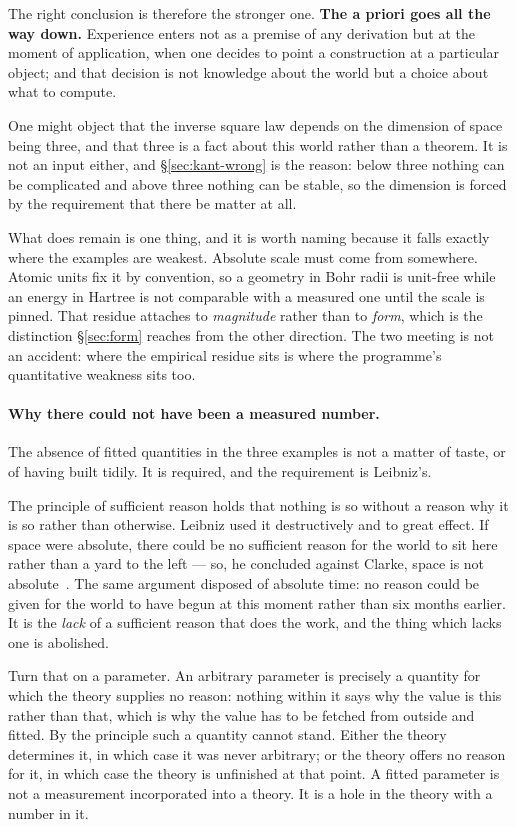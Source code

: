 \documentclass[11pt]{article}
\begin{document}
The right conclusion is therefore the stronger one. \textbf{The a priori goes all the way down.}
Experience enters not as a premise of any derivation but at the moment of application, when one
decides to point a construction at a particular object; and that decision is not knowledge about the
world but a choice about what to compute.

One might object that the inverse square law depends on the dimension of space being three, and that
three is a fact about this world rather than a theorem. It is not an input either, and
\S\ref{sec:kant-wrong} is the reason: below three nothing can be complicated and above three
nothing can be stable, so the dimension is forced by the requirement that there be matter at all.

What does remain is one thing, and it is worth naming because it falls exactly where the examples
are weakest. Absolute scale must come from somewhere. Atomic units fix it by convention, so a
geometry in Bohr radii is unit-free while an energy in Hartree is not comparable with a measured one
until the scale is pinned. That residue attaches to \emph{magnitude} rather than to \emph{form},
which is the distinction \S\ref{sec:form} reaches from the other direction. The two meeting is not
an accident: where the empirical residue sits is where the programme's quantitative weakness sits
too.

\paragraph{Why there could not have been a measured number.} The absence of fitted quantities in the
three examples is not a matter of taste, or of having built tidily. It is required, and the
requirement is Leibniz's.

The principle of sufficient reason holds that nothing is so without a reason why it is so rather
than otherwise. Leibniz used it destructively and to great effect. If space were absolute, there
could be no sufficient reason for the world to sit here rather than a yard to the left --- so, he
concluded against Clarke, space is not absolute~\cite{leibnizclarke}. The same argument disposed of absolute time: no
reason could be given for the world to have begun at this moment rather than six months earlier. It
is the \emph{lack} of a sufficient reason that does the work, and the thing which lacks one is
abolished.

Turn that on a parameter. An arbitrary parameter is precisely a quantity for which the theory
supplies no reason: nothing within it says why the value is this rather than that, which is why the
value has to be fetched from outside and fitted. By the principle such a quantity cannot stand.
Either the theory determines it, in which case it was never arbitrary; or the theory offers no
reason for it, in which case the theory is unfinished at that point. A fitted parameter is not a
measurement incorporated into a theory. It is a hole in the theory with a number in it.
\end{document}
